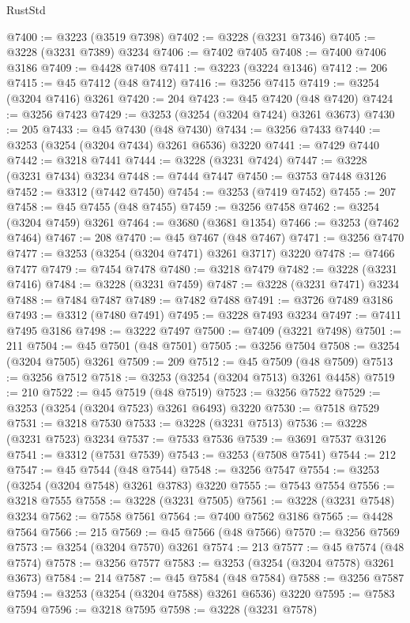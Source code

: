 \begin{lexlean}{RustStd}
\begin{coremodule}
@7400 := @3223 (@3519 @7398)
@7402 := @3228 (@3231 @7346)
@7405 := @3228 (@3231 @7389) @3234
@7406 := @7402 @7405
@7408 := @7400 @7406 @3186
@7409 := @4428 @7408
@7411 := @3223 (@3224 @1346)
@7412 := 206
@7415 := @45 @7412 (@48 @7412)
@7416 := @3256 @7415
@7419 := @3254 (@3204 @7416) @3261
@7420 := 204
@7423 := @45 @7420 (@48 @7420)
@7424 := @3256 @7423
@7429 := @3253 (@3254 (@3204 @7424) @3261 @3673)
@7430 := 205
@7433 := @45 @7430 (@48 @7430)
@7434 := @3256 @7433
@7440 := @3253 (@3254 (@3204 @7434) @3261 @6536) @3220
@7441 := @7429 @7440
@7442 := @3218 @7441
@7444 := @3228 (@3231 @7424)
@7447 := @3228 (@3231 @7434) @3234
@7448 := @7444 @7447
@7450 := @3753 @7448 @3126
@7452 := @3312 (@7442 @7450)
@7454 := @3253 (@7419 @7452)
@7455 := 207
@7458 := @45 @7455 (@48 @7455)
@7459 := @3256 @7458
@7462 := @3254 (@3204 @7459) @3261
@7464 := @3680 (@3681 @1354)
@7466 := @3253 (@7462 @7464)
@7467 := 208
@7470 := @45 @7467 (@48 @7467)
@7471 := @3256 @7470
@7477 := @3253 (@3254 (@3204 @7471) @3261 @3717) @3220
@7478 := @7466 @7477
@7479 := @7454 @7478
@7480 := @3218 @7479
@7482 := @3228 (@3231 @7416)
@7484 := @3228 (@3231 @7459)
@7487 := @3228 (@3231 @7471) @3234
@7488 := @7484 @7487
@7489 := @7482 @7488
@7491 := @3726 @7489 @3186
@7493 := @3312 (@7480 @7491)
@7495 := @3228 @7493 @3234
@7497 := @7411 @7495 @3186
@7498 := @3222 @7497
@7500 := @7409 (@3221 @7498)
@7501 := 211
@7504 := @45 @7501 (@48 @7501)
@7505 := @3256 @7504
@7508 := @3254 (@3204 @7505) @3261
@7509 := 209
@7512 := @45 @7509 (@48 @7509)
@7513 := @3256 @7512
@7518 := @3253 (@3254 (@3204 @7513) @3261 @4458)
@7519 := 210
@7522 := @45 @7519 (@48 @7519)
@7523 := @3256 @7522
@7529 := @3253 (@3254 (@3204 @7523) @3261 @6493) @3220
@7530 := @7518 @7529
@7531 := @3218 @7530
@7533 := @3228 (@3231 @7513)
@7536 := @3228 (@3231 @7523) @3234
@7537 := @7533 @7536
@7539 := @3691 @7537 @3126
@7541 := @3312 (@7531 @7539)
@7543 := @3253 (@7508 @7541)
@7544 := 212
@7547 := @45 @7544 (@48 @7544)
@7548 := @3256 @7547
@7554 := @3253 (@3254 (@3204 @7548) @3261 @3783) @3220
@7555 := @7543 @7554
@7556 := @3218 @7555
@7558 := @3228 (@3231 @7505)
@7561 := @3228 (@3231 @7548) @3234
@7562 := @7558 @7561
@7564 := @7400 @7562 @3186
@7565 := @4428 @7564
@7566 := 215
@7569 := @45 @7566 (@48 @7566)
@7570 := @3256 @7569
@7573 := @3254 (@3204 @7570) @3261
@7574 := 213
@7577 := @45 @7574 (@48 @7574)
@7578 := @3256 @7577
@7583 := @3253 (@3254 (@3204 @7578) @3261 @3673)
@7584 := 214
@7587 := @45 @7584 (@48 @7584)
@7588 := @3256 @7587
@7594 := @3253 (@3254 (@3204 @7588) @3261 @6536) @3220
@7595 := @7583 @7594
@7596 := @3218 @7595
@7598 := @3228 (@3231 @7578)

\end{coremodule}
\end{lexlean}
